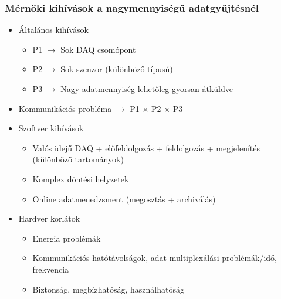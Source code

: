 \subsubsection{Mérnöki kihívások a nagymennyiségű adatgyűjtésnél}
\begin{itemize}
    \item Általános kihívások
    \begin{itemize}
        \item P1 $\rightarrow$ Sok DAQ csomópont
        \item P2 $\rightarrow$ Sok szenzor (különböző típusú)
        \item P3 $\rightarrow$ Nagy adatmennyiség lehetőleg gyorsan átküldve
    \end{itemize}
    \item Kommunikációs probléma $\rightarrow$ P1 $\times$ P2 $\times$ P3
    \item Szoftver kihívások
    \begin{itemize}
        \item Valós idejű DAQ + előfeldolgozás + feldolgozás + megjelenítés (különböző tartományok)
        \item Komplex döntési helyzetek
        \item Online adatmenedzsment (megosztás + archiválás)
    \end{itemize}
    \item Hardver korlátok
    \begin{itemize}
        \item Energia problémák
        \item Kommunikációs hatótávolságok, adat multiplexálási problémák/idő, frekvencia
        \item Biztonság, megbízhatóság, használhatóság
    \end{itemize}
\end{itemize}
